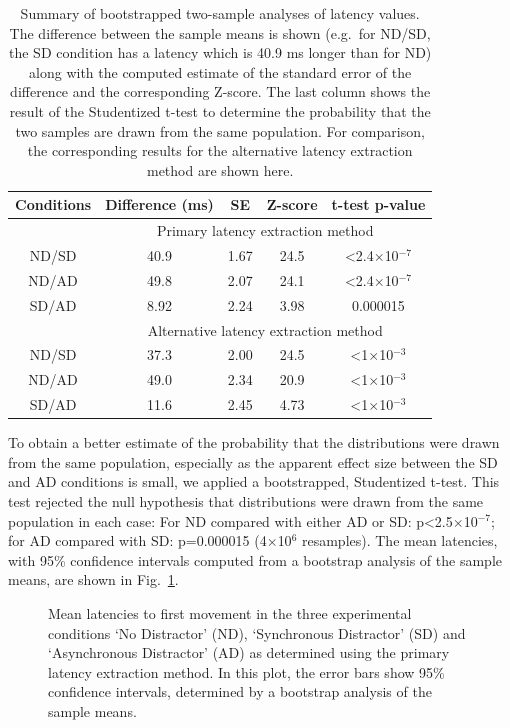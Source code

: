 \documentclass[10pt,letterpaper]{article}
\begin{document}
\begin{table}[ht]
\caption{Summary of bootstrapped two-sample analyses of latency
  values. The difference between the sample means is shown (e.g.~for
  ND/SD, the SD condition has a latency which is 40.9 ms longer than
  for ND) along with the computed estimate of the standard error of
  the difference and the corresponding Z-score. The last column shows
  the result of the Studentized t-test to determine the probability
  that the two samples are drawn from the same population. For
  comparison, the corresponding results for the alternative latency
  extraction method are shown here.}  \centering
\begin{tabular}{c c c c c}
\hline
\textbf{Conditions} & \textbf{Difference (ms)} & \textbf{SE} & \textbf{Z-score} & \textbf{t-test p-value} \\ [0.5ex]
\hline
~ & \multicolumn{4}{c}{Primary latency extraction method} \\
\hline
ND/SD & 40.9 & 1.67 & 24.5 & \textless2.4$\times$10$^{-7}$ \\
ND/AD & 49.8 & 2.07 & 24.1 & \textless2.4$\times$10$^{-7}$ \\
SD/AD & 8.92 & 2.24 & 3.98 & 0.000015 \\ [1ex]
\hline
~ & \multicolumn{4}{c}{Alternative latency extraction method} \\
\hline
ND/SD & 37.3 & 2.00 & 24.5 & \textless1$\times$10$^{-3}$ \\
ND/AD & 49.0 & 2.34 & 20.9 & \textless1$\times$10$^{-3}$ \\
SD/AD & 11.6 & 2.45 & 4.73 & \textless1$\times$10$^{-3}$ \\ [1ex]
\hline
\end{tabular}
\label{table:twosample}
\end{table}

To obtain a better estimate of the probability that the distributions
were drawn from the same population, especially as the apparent effect
size between the SD and AD conditions is small, we applied a
bootstrapped, Studentized t-test. This test rejected the null
hypothesis that distributions were drawn from the same population in
each case: For ND compared with either AD or SD:
p\textless2.5$\times$10$^{-7}$; for AD compared with SD: p=0.000015
(4$\times$10$^{6}$ resamples). The mean latencies, with 95\%
confidence intervals computed from a bootstrap analysis of the sample
means, are shown in Fig.~\ref{meanmad}.

\begin{figure}[htb!]
\centering
\caption[Mean latencies] {Mean latencies to first movement in the
  three experimental conditions `No Distractor' (ND), `Synchronous
  Distractor' (SD) and `Asynchronous Distractor' (AD) as determined
  using the primary latency extraction method. In this plot, the
  error bars show 95\% confidence intervals, determined by a bootstrap
  analysis of the sample means.}
\label{meanmad}
\end{figure}
\end{document}
